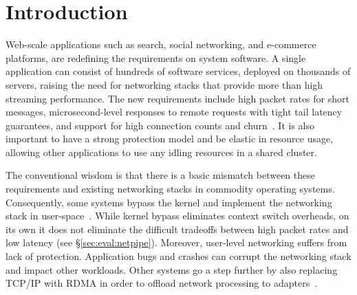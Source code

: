
\section{Introduction}
\label{sec:intro}


Web-scale applications such as search, social networking, and
e-commerce platforms, are redefining the requirements on system
software. A single application can consist of hundreds of software
services, deployed on thousands of servers, raising the need for
networking stacks that provide more than high streaming performance.
The new requirements include high packet rates for short messages,
microsecond-level responses to remote requests with tight tail latency
guarantees, and support for high connection counts and
churn~\cite{Atikoglu:2012:WAL,DBLP:journals/cacm/DeanB13,DBLP:conf/nsdi/NishtalaFGKLLMPPSSTV13}.
It is also important to have a strong protection model and be elastic
in resource usage, allowing other applications to use any idling
resources in a shared
cluster. %

The conventional wisdom is that there is a basic mismatch between
these requirements and existing networking stacks in commodity
operating systems. Consequently, some systems bypass the kernel and
implement the networking stack in
user-space~\cite{jeong2014mtcp,DBLP:conf/cloud/KapoorPTVV12,sandstorm,openonload,DBLP:conf/sigcomm/ThekkathNML93}.
While kernel bypass eliminates context switch overheads, on its own it
does not eliminate the difficult tradeoffs between high packet rates
and low latency (see \S\ref{sec:eval:netpipe}). Moreover, user-level networking
suffers from lack of protection. Application bugs and crashes can
corrupt the networking stack and impact other workloads.
Other systems go a step further by also replacing TCP/IP with RDMA in
order to offload network processing to 
adapters~\cite{dragojevic14farm,DBLP:conf/icpp/JoseSLZHWIOWSP11,mitchell:rdma,DBLP:conf/sosp/OngaroRSOR11}.



